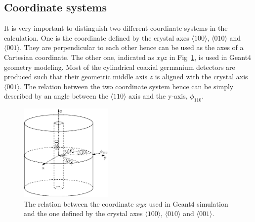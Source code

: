 \subsection{Coordinate systems}
\label{sec:pss:xyz}
It is very important to distinguish two different coordinate systems in the calculation. One is the coordinate defined by the crystal axes $\langle100\rangle$, $\langle010\rangle$ and $\langle001\rangle$. They are perpendicular to each other hence can be used as the axes of a Cartesian coordinate. The other one, indicated as $xyz$ in Fig~\ref{fig:pss:coo}, is used in Geant4 geometry modeling. Most of the cylindrical coaxial germanium detectors are produced such that their geometric middle axis $z$ is aligned with the crystal axis $\langle 001 \rangle$. The relation between the two coordinate system hence can be simply described by an angle between the $\langle110\rangle$ axis and the y-axis, $\phi_{110}$.
\begin{figure}
\centering
\includegraphics[width=0.4\textwidth]{coordins}  
\caption{The relation between the coordinate $xyz$ used in Geant4 simulation and the one defined by the crystal axes $\langle100\rangle$, $\langle010\rangle$ and $\langle001\rangle$.}
\label{fig:pss:coo}
\end{figure}

